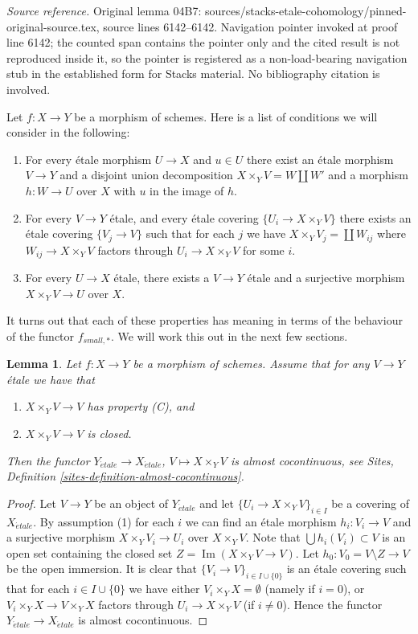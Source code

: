 \documentclass[10pt,a4paper]{amsart}
\theoremstyle{plain}
\newtheorem{lemma}[subsection]{Lemma}
\theoremstyle{definition}
\theoremstyle{remark}
\numberwithin{equation}{subsection}
\def\etale{{\acute{e}tale}}
\def\Im{\mathop{\mathrm{Im}}}
\begin{document}
\noindent\textit{Source reference.} Original lemma 04B7: sources/stacks-etale-cohomology/pinned-original-source.tex, source lines 6142--6142. Navigation pointer invoked at proof line 6142; the counted span contains the pointer only and the cited result is not reproduced inside it, so the pointer is registered as a non-load-bearing navigation stub in the established form for Stacks material. No bibliography citation is involved.\par\medskip
\noindent
Let $f : X \to Y$ be a morphism of schemes.
Here is a list of conditions we will consider in the following:
\begin{enumerate}
\item[(A)] For every \'etale morphism $U \to X$ and $u \in U$ there exist
an \'etale morphism $V \to Y$ and a disjoint union decomposition
$X \times_Y V = W \amalg W'$ and a morphism $h : W \to U$ over $X$
with $u$ in the image of $h$.
\item[(B)] For every $V \to Y$ \'etale, and every \'etale covering
$\{U_i \to X \times_Y V\}$ there exists an \'etale covering
$\{V_j \to V\}$ such that for each $j$ we have
$X \times_Y V_j = \coprod W_{ij}$ where $W_{ij} \to X \times_Y V$
factors through $U_i \to X \times_Y V$ for some $i$.
\item[(C)] For every $U \to X$ \'etale, there exists a $V \to Y$ \'etale
and a surjective morphism $X \times_Y V \to U$ over $X$.
\end{enumerate}
It turns out that each of these properties has meaning in terms of
the behaviour of the functor $f_{small, *}$. We will work this
out in the next few sections.

\begin{lemma}
\label{lemma-property-C-closed-implies}
Let $f : X \to Y$ be a morphism of schemes. Assume that
for any $V \to Y$ \'etale we have that
\begin{enumerate}
\item $X \times_Y V \to V$ has property (C), and
\item $X \times_Y V \to V$ is closed.
\end{enumerate}
Then the functor
$Y_\etale \to X_\etale$, $V \mapsto X \times_Y V$
is almost cocontinuous, see
Sites, Definition \ref{sites-definition-almost-cocontinuous}.
\end{lemma}

\begin{proof}
Let $V \to Y$ be an object of $Y_\etale$ and let
$\{U_i \to X \times_Y V\}_{i \in I}$ be a covering of $X_\etale$.
By assumption (1) for each $i$ we can find an \'etale morphism
$h_i : V_i \to V$ and a surjective morphism $X \times_Y V_i \to U_i$
over $X \times_Y V$. Note that $\bigcup h_i(V_i) \subset V$ is an
open set containing the closed set $Z = \Im(X \times_Y V \to V)$.
Let $h_0 : V_0 = V \setminus Z \to V$ be the open immersion.
It is clear that $\{V_i \to V\}_{i \in I \cup \{0\}}$ is an
\'etale covering such that for each $i \in I \cup \{0\}$ we have
either $V_i \times_Y X = \emptyset$ (namely if $i = 0$), or
$V_i \times_Y X \to V \times_Y X$ factors through $U_i \to X \times_Y V$
(if $i \not = 0$). Hence the functor $Y_\etale \to X_\etale$
is almost cocontinuous.
\end{proof}
\end{document}
